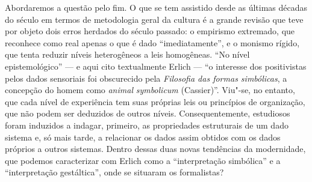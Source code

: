 Abordaremos a questão pelo fim. O que se tem assistido desde as últimas
décadas do século  em termos de metodologia geral da cultura é a
grande revisão que teve por objeto dois erros herdados do século
passado: o empirismo extremado, que reconhece como real apenas o que é
dado ``imediatamente'', e o monismo rígido, que tenta reduzir níveis
heterogêneos a leis homogêneas. ``No nível
epistemológico'' --- e aqui cito textualmente Erlich --- ``o interesse dos
positivistas pelos dados sensoriais foi obscurecido pela \emph{Filosofia
das formas simbólicas}, a concepção do homem como \emph{animal}
\emph{symbolicum} (Cassier)''.
Viu"-se, no entanto, que cada nível de experiência tem suas próprias leis ou
princípios de organização, que não podem ser deduzidos de outros níveis.
Consequentemente, estudiosos foram induzidos a indagar, primeiro, as
propriedades estruturais de um dado sistema e, só mais tarde, a
relacionar os dados assim obtidos com os dados próprios a outros
sistemas. Dentro dessas duas novas tendências da modernidade, que
podemos caracterizar com Erlich como a ``interpretação simbólica'' e a
``interpretação gestáltica'', onde se situaram os formalistas?

